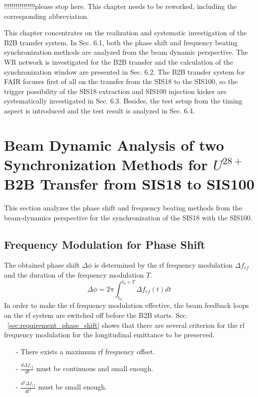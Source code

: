 !!!!!!!!!!!!!!!!please stop here. This chapter needs to be reworked, including the corresponding abbreviation.

This chapter concentrates on the realization and systematic investigation of the \gls{B2B} transfer system. In Sec. 6.1, both the phase shift and frequency beating synchronization methods are analyzed from the beam dynamic perspective. The WR network is investigated for the B2B transfer and the calculation of the synchronization window are presented in Sec. 6.2. The B2B transfer system for FAIR focuses first of all on the transfer from the SIS18 to the SIS100, so the trigger possibility of the SIS18 extraction and SIS100 injection kicker are systematically investigated in Sec. 6.3. Besides, the test setup from the timing aspect is introduced and the test result is analyzed in Sec. 6.4. 

\section{Beam Dynamic Analysis of two Synchronization Methods for $U^{28+}$ B2B Transfer from SIS18 to SIS100}
This section analyzes the phase shift and frequency beating methods from the beam-dynamics perspective for the synchronization of the SIS18 with the SIS100. 
\subsection{Frequency Modulation for Phase Shift}
The obtained phase shift $\Delta \phi$ is determined by the rf frequency modulation $\Delta f_{rf}$ and the duration of the frequency modulation $T$. 
\begin{equation}
\Delta \phi= 2\pi \int_{t_0}^{t_0+T} \Delta f_{rf}(t)dt \label{phase_integration}
\end{equation}
In order to make the rf frequency modulation effective, the beam feedback loops on the rf system are switched off before the B2B starts. Sec. ~\ref{sec:requirement_phase_shift} shows that there are several criterion for the rf frequency modulation for the longitudinal emittance to be preserved.
\begin{itemize}
\item[-]
There exists a maximum rf frequency offset. 
\item[-]
$\frac{d\Delta f_{\mathit{rf}}}{dt}$ must be continuous and small enough. 
\item[-]
$\frac{d^2\Delta f_{\mathit{rf}}}{dt^2}$ must be small enough. 
\end{itemize}

